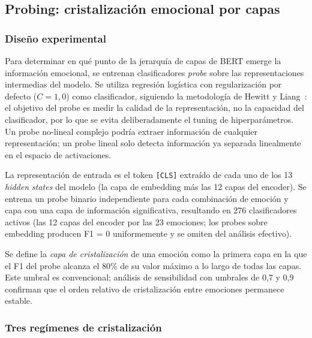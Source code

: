 
\subsection{Probing: cristalización emocional por capas}
\label{sec:probing}

\subsubsection{Diseño experimental}

Para determinar en qué punto de la jerarquía de capas de BERT emerge la
información emocional, se entrenan clasificadores \emph{probe} sobre las
representaciones intermedias del modelo. Se utiliza regresión logística
con regularización por defecto ($C = 1{,}0$) como clasificador, siguiendo
la metodología de Hewitt y Liang~\cite{hewitt2019designing}: el objetivo
del probe es medir la calidad de la representación, no la capacidad del
clasificador, por lo que se evita deliberadamente el tuning de
hiperparámetros. Un probe no-lineal complejo podría extraer información
de cualquier representación; un probe lineal solo detecta información ya
separada linealmente en el espacio de activaciones.

La representación de entrada es el token \texttt{[CLS]} extraído de cada
uno de los 13 \textit{hidden states} del modelo (la capa de embedding más
las 12 capas del encoder). Se entrena un probe binario independiente para
cada combinación de emoción y capa con una capa de información
significativa, resultando en 276 clasificadores activos (las 12 capas del
encoder por las 23 emociones; los probes sobre embedding producen
F1 = 0 uniformemente y se omiten del análisis efectivo).

Se define la \emph{capa de cristalización} de una emoción como la primera
capa en la que el F1 del probe alcanza el 80\% de su valor máximo a lo
largo de todas las capas. Este umbral es convencional; análisis de
sensibilidad con umbrales de 0{,}7 y 0{,}9 confirman que el orden
relativo de cristalización entre emociones permanece estable.

\subsubsection{Tres regímenes de cristalización}

